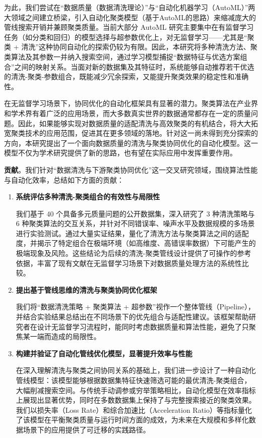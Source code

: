 \documentclass[10pt]{article} %
\numberwithin{equation}{section}
\begin{document}
为此，我们尝试在“数据质量（数据清洗理论）”与“自动化机器学习（AutoML）”两大领域之间建立桥梁，引入自动化聚类模型（基于AutoML的思路）来缩减庞大的管线搜索开销并兼顾聚类质量。当前大部分 AutoML 研究主要集中在有监督学习任务（如分类和回归）的模型选择与超参数优化上，对无监督学习——尤其是“聚类 + 清洗”这种协同自动化的探索仍较为有限。因此，本研究将多种清洗方法、聚类算法及其参数一并纳入搜索空间，通过学习模型捕捉“数据特征与优选方案组合”之间的映射关系。当面对新的数据集及其特征时，系统能够自动推荐若干优选的清洗-聚类-参数组合，既能减少冗余探索，又能提升聚类效果的稳定性和准确性。

在无监督学习场景下，协同优化的自动化框架具有显著的潜力。聚类算法在产业界和学术界有着广泛的应用场景，而大多数真实世界的数据通常都存在一定的质量问题。因此，如果能够实现对数据质量的适配清洗与高效聚类的有机结合，将大大拓宽聚类技术的应用范围，促进其在更多领域的落地。针对这一尚未得到充分探索的方向，本研究提出了一个面向数据质量的清洗与聚类协同优化的自动化模型。这一模型不仅为学术研究提供了新的思路，也有望在实际应用中发挥重要作用。

\textbf{贡献}。我们针对“数据清洗与下游聚类协同优化”这一交叉研究领域，围绕算法性能与自动化效率，总结如下方面的贡献：
\begin{enumerate}
    \item \textbf{系统评估多种清洗-聚类组合的有效性与局限性}  

    我们基于 40 个具备多元质量问题的公开数据集，深入研究了 3 种清洗策略与 6 种聚类算法的交互关系，并针对不同错误率、噪声水平及数据规模的多场景进行实验测试。通过大量实证结果，量化了清洗方法与聚类算法之间的适配度，并揭示了特定组合在极端环境（如高维度、高错误率数据）下可能产生的极端现象及风险。这些结论为后续的清洗-聚类管线设计提供了可操作的参考依据，丰富了现有文献在无监督学习场景下对数据质量处理方法的系统性比较。

    \item \textbf{提出基于管线思维的清洗与聚类协同优化框架}  

    我们将“数据清洗策略 + 聚类算法 + 超参数”视作一个整体管线（Pipeline），并结合实验结果总结出在不同场景下的优先组合与适配性建议。该框架帮助研究者在设计无监督学习流程时，能同时考虑数据质量和算法性能，避免了只聚焦某一端而造成的局限性。

    \item \textbf{构建并验证了自动化管线优化模型，显著提升效率与性能}  

    在深入理解清洗与聚类之间协同关系的基础上，我们进一步设计了一种自动化管线模型：该模型能够根据数据集特征快速筛选可能的最优清洗-聚类组合，大幅削减搜索空间。与传统手动调参或穷举策略相比，自动化模型在效率指标上展现出显著优势，同时在多数数据集上保持了与完整搜索接近的聚类效果。我们以损失率（Loss Rate）和综合加速比（Acceleration Ratio）等指标量化了该模型在平衡聚类质量与运行时间方面的成效，为未来在大规模和多样化数据场景下的应用提供了可迁移的实践路径。

\end{enumerate}
\end{document}
